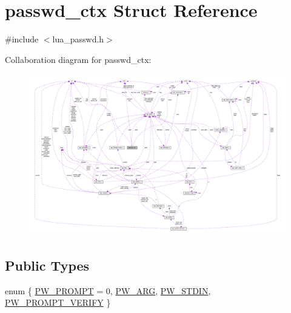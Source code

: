 \hypertarget{structpasswd__ctx}{}\section{passwd\+\_\+ctx Struct Reference}
\label{structpasswd__ctx}


{\ttfamily \#include $<$lua\+\_\+passwd.\+h$>$}



Collaboration diagram for passwd\+\_\+ctx\+:
\nopagebreak
\begin{figure}[H]
\begin{center}
\leavevmode
\includegraphics[width=350pt]{structpasswd__ctx__coll__graph}
\end{center}
\end{figure}
\subsection*{Public Types}
\begin{DoxyCompactItemize}
\item 
enum \{ \hyperlink{structpasswd__ctx_a1cb4b707f844b91078a8a07dfb95394fac383443d90eb33ac2974262a9e023c74}{P\+W\+\_\+\+P\+R\+O\+M\+PT} = 0, 
\hyperlink{structpasswd__ctx_a1cb4b707f844b91078a8a07dfb95394fa7e4f1eaf780b78b2e48f15fe2c30fc92}{P\+W\+\_\+\+A\+RG}, 
\hyperlink{structpasswd__ctx_a1cb4b707f844b91078a8a07dfb95394fa83c2c0b1415768d01e85b2745ba49465}{P\+W\+\_\+\+S\+T\+D\+IN}, 
\hyperlink{structpasswd__ctx_a1cb4b707f844b91078a8a07dfb95394faa94d10d17ee8fb9dad9a0aa0e56ae65a}{P\+W\+\_\+\+P\+R\+O\+M\+P\+T\+\_\+\+V\+E\+R\+I\+FY}
 \}
\end{DoxyCompactItemize}
